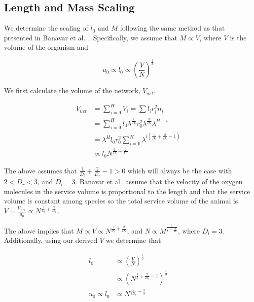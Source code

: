 \documentclass[12pt]{article}
\begin{document}
\begin{caseof}

\end{caseof}

\subsection{Length and Mass Scaling}
\label{subsec:appendixLengthMass}

We determine the scaling of $l_0$ and $M$ following the same method as that
presented in Banavar et al.~\cite{banavar10}. Specifically, we assume that $M
\propto V$, where $V$ is the volume of the organism and

\begin{equation}
u_0 \propto l_0 \propto \left (\frac{V}{N} \right) ^{\frac{1}{3}}
\end{equation}

We first calculate the volume of the network, $V_{net}$.

\begin{align*}
V_{net} &= \sum_{i=0}^H V_i = \sum l_i r_i^2 n_i \\
  &= \sum_{i=0}^H l_0 \lambda^{\frac{i}{D_l}} r_0^2 \lambda^{\frac{2i}{D_r}}
  \lambda^{H-i} \\
  &= \lambda^H l_0 r_0^2 \sum_{i=0}^H \lambda^{i \left(\frac{i}{D_l} +
  \frac{2}{D_r} - 1 \right) } \\
  &\propto l_0 N^{\frac{1}{D_l} + \frac{2}{D_r}} 
\end{align*}

\noindent The above assumes that $\frac{1}{D_l} + \frac{2}{D_r} -1 > 0$ which
will always be the case with $2 < D_r < 3$, and $D_l=3$. Banavar et al.\ assume
that the velocity of the oxygen molecules in the service volume is proportional
to the length and that the service volume is constant among species so the
total service volume of the animal is $V = \frac{V_{net}}{u_0} \propto
N^{\frac{1}{D_l} + \frac{2}{D_r}}$.

The above implies that $M\propto V \propto N^{\frac{1}{D_l} +
\frac{2}{D_r}}$,
and $N \propto M^{\frac{1}{\frac{1}{3} + \frac{2}{D_r}}}$, where $D_l=3$.
Additionally, using our derived $V$ we determine that

\begin{align*}
l_0 & \propto \left( \frac{V}{N} \right)^{\frac{1}{3}} \\
    & \propto \left( N^{\frac{1}{3} + \frac{2}{D_r} - 1} \right)^{\frac{1}{3}} \\
u_0 \propto l_0 & \propto N^{\frac{2}{3D_r} - \frac{2}{9}}
\end{align*}
\end{document}
